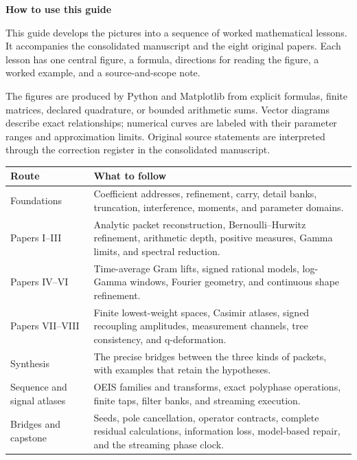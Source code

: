 \documentclass[11pt]{article}
\begin{document}

\hypersetup{pageanchor=false}

\hypersetup{pageanchor=true}
{\LARGE\bfseries How to use this guide\par}
\vspace{0.2in}
This guide develops the pictures into a sequence of worked mathematical lessons. It accompanies the consolidated manuscript and the eight original papers. Each lesson has one central figure, a formula, directions for reading the figure, a worked example, and a source-and-scope note.

The figures are produced by Python and Matplotlib from explicit formulas, finite matrices, declared quadrature, or bounded arithmetic sums. Vector diagrams describe exact relationships; numerical curves are labeled with their parameter ranges and approximation limits. Original source statements are interpreted through the correction register in the consolidated manuscript.

\vspace{0.1in}
\begin{tabular}{>{\raggedright\arraybackslash}p{1.25in}>{\raggedright\arraybackslash}p{5.1in}}
\toprule
Route & What to follow\\
\midrule
Foundations & Coefficient addresses, refinement, carry, detail banks, truncation, interference, moments, and parameter domains.\\[0.09in]
Papers I--III & Analytic packet reconstruction, Bernoulli--Hurwitz refinement, arithmetic depth, positive measures, Gamma limits, and spectral reduction.\\[0.09in]
Papers IV--VI & Time-average Gram lifts, signed rational models, log-Gamma windows, Fourier geometry, and continuous shape refinement.\\[0.09in]
Papers VII--VIII & Finite lowest-weight spaces, Casimir atlases, signed recoupling amplitudes, measurement channels, tree consistency, and q-deformation.\\[0.09in]
Synthesis & The precise bridges between the three kinds of packets, with examples that retain the hypotheses.\\[0.09in]
Sequence and signal atlases & OEIS families and transforms, exact polyphase operations, finite taps, filter banks, and streaming execution.\\[0.09in]
Bridges and capstone & Seeds, pole cancellation, operator contracts, complete residual calculations, information loss, model-based repair, and the streaming phase clock.\\
\bottomrule
\end{tabular}\par
\end{document}
